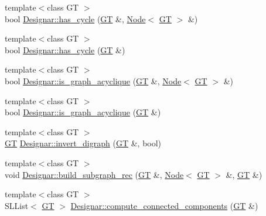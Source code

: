 \begin{DoxyCompactItemize}
\item 
{\footnotesize template$<$class GT $>$ }\\bool \hyperlink{namespace_designar_a279a11030cf78659ddbdec00473f0365}{Designar\+::has\+\_\+cycle} (\hyperlink{demo-buildgraph_8_c_a3001c40d2c31ca87ed96cd7d1334a55e}{GT} \&, \hyperlink{test-mtreenode_8_c_a17a24b0725f59987143c5faf63c4dc6f}{Node}$<$ \hyperlink{demo-buildgraph_8_c_a3001c40d2c31ca87ed96cd7d1334a55e}{GT} $>$ \&)
\item 
{\footnotesize template$<$class GT $>$ }\\bool \hyperlink{namespace_designar_a4b250ae7cdab37b1a1489179266ef5d6}{Designar\+::has\+\_\+cycle} (\hyperlink{demo-buildgraph_8_c_a3001c40d2c31ca87ed96cd7d1334a55e}{GT} \&)
\item 
{\footnotesize template$<$class GT $>$ }\\bool \hyperlink{namespace_designar_a745761588a29956929fda0d246ebbef5}{Designar\+::is\+\_\+graph\+\_\+acyclique} (\hyperlink{demo-buildgraph_8_c_a3001c40d2c31ca87ed96cd7d1334a55e}{GT} \&, \hyperlink{test-mtreenode_8_c_a17a24b0725f59987143c5faf63c4dc6f}{Node}$<$ \hyperlink{demo-buildgraph_8_c_a3001c40d2c31ca87ed96cd7d1334a55e}{GT} $>$ \&)
\item 
{\footnotesize template$<$class GT $>$ }\\bool \hyperlink{namespace_designar_a2cf5f0717993e7d2a4dbc26ff8380a72}{Designar\+::is\+\_\+graph\+\_\+acyclique} (\hyperlink{demo-buildgraph_8_c_a3001c40d2c31ca87ed96cd7d1334a55e}{GT} \&)
\item 
{\footnotesize template$<$class GT $>$ }\\\hyperlink{demo-buildgraph_8_c_a3001c40d2c31ca87ed96cd7d1334a55e}{GT} \hyperlink{namespace_designar_a35a0d2875876e94cc6f9036f85491091}{Designar\+::invert\+\_\+digraph} (\hyperlink{demo-buildgraph_8_c_a3001c40d2c31ca87ed96cd7d1334a55e}{GT} \&, bool)
\item 
{\footnotesize template$<$class GT $>$ }\\void \hyperlink{namespace_designar_a035e48f6f48994ed7b1fd8c6d7f3ec32}{Designar\+::build\+\_\+subgraph\+\_\+rec} (\hyperlink{demo-buildgraph_8_c_a3001c40d2c31ca87ed96cd7d1334a55e}{GT} \&, \hyperlink{test-mtreenode_8_c_a17a24b0725f59987143c5faf63c4dc6f}{Node}$<$ \hyperlink{demo-buildgraph_8_c_a3001c40d2c31ca87ed96cd7d1334a55e}{GT} $>$ \&, \hyperlink{demo-buildgraph_8_c_a3001c40d2c31ca87ed96cd7d1334a55e}{GT} \&)
\item 
{\footnotesize template$<$class GT $>$ }\\S\+L\+List$<$ \hyperlink{demo-buildgraph_8_c_a3001c40d2c31ca87ed96cd7d1334a55e}{GT} $>$ \hyperlink{namespace_designar_a1f5287eee752172e2db8bd4cd148f93b}{Designar\+::compute\+\_\+connected\+\_\+components} (\hyperlink{demo-buildgraph_8_c_a3001c40d2c31ca87ed96cd7d1334a55e}{GT} \&)

\end{DoxyCompactItemize}
